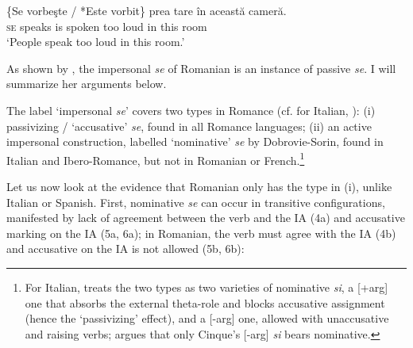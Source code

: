 \documentclass[output=paper]{langsci/langscibook}
\begin{document}
\ea%
    \label{ex:giurgea:3}
    \gll \{Se vorbeşte / *Este vorbit\} prea tare în această cameră.\\
         \textsc{se} speaks  {}     is      spoken too  loud in this       room\\
    \glt ‘People speak too loud in this room.’
    \z

As shown by \citet{Dobrovie-Sorin1998}, the impersonal \textit{se} of Romanian is an instance of passive \textit{se}. I will summarize her arguments below.

The label ‘impersonal \textit{se}' covers two types in Romance (cf. \citealt{Belletti1982,Manzini1986,Burzio1986} for Italian, \citealt{Dobrovie-Sorin1998,Dobrovie-Sorin2006,Dobrovie-Sorin2017}): (i) passivizing / ‘accusative' \textit{se}, found in all Romance languages; (ii) an active impersonal construction, labelled ‘nominative' \textit{se} by Dobrovie-Sorin, found in Italian and Ibero-Romance, but not in Romanian or French.\footnote{For Italian, \citet{Cinque1988} treats the two types as two varieties of nominative \textit{si}, a [+arg] one that absorbs the external theta-role and blocks accusative assignment (hence the ‘passivizing' effect), and a [-arg] one, allowed with unaccusative and  raising verbs; \citet{Dobrovie-Sorin1998} argues that only Cinque’s [-arg] \textit{si} bears nominative.} 

Let us now look at the evidence that Romanian only has the type in (i), unlike Italian or Spanish. First, nominative \textit{se} can occur in transitive configurations, manifested by lack of agreement between the verb and the IA (4a) and accusative marking on the IA (5a, 6a); in Romanian, the verb must agree with the IA (4b) and accusative on the IA is not allowed (5b, 6b):

\ea%
    \label{ex:giurgea:4}
    \z
\z
\end{document}
